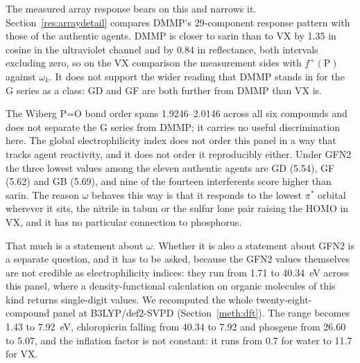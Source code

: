 \documentclass[11pt,a4paper]{article}
\begin{document}
The measured array response bears on this and narrows it.
Section~\ref{res:arraydetail} compares DMMP's 29-component response pattern with those of
the authentic agents. DMMP is closer to sarin than to VX by 1.35 in cosine in
the ultraviolet channel and by 0.84 in reflectance, both intervals excluding
zero, so on the VX comparison the measurement sides with $f^{+}(\mathrm{P})$
against $\omega_k$. It does not support the wider reading that DMMP stands in
for the G series as a class: GD and GF are both further from DMMP than VX is.

\begin{table}[!htb]
\centering
\caption{GFN2-xTB local reactivity at phosphorus for the six phosphorus-bearing
compounds. $f^{+}(\mathrm{P})$ is the condensed Fukui index for nucleophilic
attack at phosphorus. $\omega$ is the global electrophilicity index in the
definition of Parr et al.~\cite{parr1999} with $\eta$ equal to half the
HOMO--LUMO gap, and $\omega_k = \omega f^{+}(\mathrm{P})$ is the composite local
electrophilicity of Domingo et al.~\cite{domingo2016}. The two reactivity
conventions disagree about VX and the text says why.}
\label{tab:plocal}
\small

\end{table}

The Wiberg P=O bond order spans 1.9246--2.0146 across all six compounds and does
not separate the G series from DMMP; it carries no useful discrimination here.
The global electrophilicity index does not order this panel in a way that
tracks agent reactivity, and it does not order it reproducibly either. Under
GFN2 the three lowest values among the eleven authentic agents are GD (5.54),
GF (5.62) and GB (5.69), and nine of the fourteen interferents score higher
than sarin. The reason $\omega$ behaves this way is that it responds to the
lowest $\pi^{*}$ orbital wherever it sits, the nitrile in tabun or the sulfur
lone pair raising the HOMO in VX, and it has no particular connection to
phosphorus.

That much is a statement about $\omega$. Whether it is also a statement about
GFN2 is a separate question, and it has to be asked, because the GFN2 values
themselves are not credible as electrophilicity indices: they run from 1.71 to
40.34~eV across this panel, where a density-functional calculation on organic
molecules of this kind returns single-digit values. We recomputed the whole
twenty-eight-compound panel at B3LYP/def2-SVPD (Section~\ref{meth:dft}). The
range becomes 1.43 to 7.92~eV, chloropicrin falling from 40.34 to 7.92 and
phosgene from 26.60 to 5.07, and the inflation factor is not constant: it runs
from 0.7 for water to 11.7 for VX.
\end{document}
